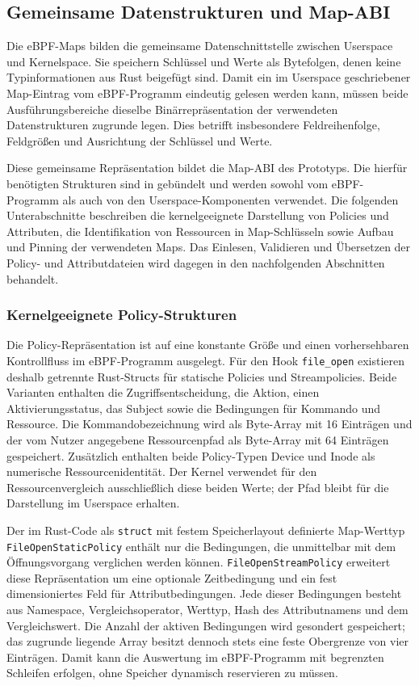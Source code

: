 \subsection{Gemeinsame Datenstrukturen und Map-ABI}\label{sec:map-abi}
Die eBPF-Maps bilden die gemeinsame Datenschnittstelle zwischen Userspace und Kernelspace. Sie speichern Schlüssel und Werte als Bytefolgen, denen keine Typinformationen aus Rust beigefügt sind. Damit ein im Userspace geschriebener Map-Eintrag vom eBPF-Programm eindeutig gelesen werden kann, müssen beide Ausführungsbereiche dieselbe Binärrepräsentation der verwendeten Datenstrukturen zugrunde legen. Dies betrifft insbesondere Feldreihenfolge, Feldgrößen und Ausrichtung der Schlüssel und Werte.

Diese gemeinsame Repräsentation bildet die Map-ABI des Prototyps. Die hierfür benötigten Strukturen sind in  gebündelt und werden sowohl vom eBPF-Programm als auch von den Userspace-Komponenten verwendet. Die folgenden Unterabschnitte beschreiben die kernelgeeignete Darstellung von Policies und Attributen, die Identifikation von Ressourcen in Map-Schlüsseln sowie Aufbau und Pinning der verwendeten Maps. Das Einlesen, Validieren und Übersetzen der Policy- und Attributdateien wird dagegen in den nachfolgenden Abschnitten behandelt.

\subsubsection{Kernelgeeignete Policy-Strukturen}
Die Policy-Repräsentation ist auf eine konstante Größe und einen vorhersehbaren Kontrollfluss im eBPF-Programm ausgelegt.
Für den Hook \texttt{file\_open} existieren deshalb getrennte Rust-Structs für statische Policies und Streampolicies.
Beide Varianten enthalten die Zugriffsentscheidung, die Aktion, einen Aktivierungsstatus, das Subject sowie die Bedingungen für Kommando und Ressource.
Die Kommandobezeichnung wird als Byte-Array mit 16 Einträgen und der vom Nutzer angegebene
Ressourcenpfad als Byte-Array mit 64 Einträgen gespeichert. Zusätzlich enthalten beide Policy-Typen
Device und Inode als numerische Ressourcenidentität. Der Kernel verwendet für den
Ressourcenvergleich ausschließlich diese beiden Werte; der Pfad bleibt für die Darstellung im
Userspace erhalten.

Der im Rust-Code als \texttt{struct} mit festem Speicherlayout definierte Map-Werttyp \texttt{FileOpenStaticPolicy} enthält nur die Bedingungen, die unmittelbar mit dem Öffnungsvorgang verglichen werden können. \texttt{FileOpenStreamPolicy} erweitert diese Repräsentation um eine optionale Zeitbedingung und ein fest dimensioniertes Feld für Attributbedingungen. Jede dieser Bedingungen besteht aus Namespace, Vergleichsoperator, Werttyp, Hash des Attributnamens und dem Vergleichswert. Die Anzahl der aktiven Bedingungen wird gesondert gespeichert; das zugrunde liegende Array besitzt dennoch stets eine feste Obergrenze von vier Einträgen. Damit kann die Auswertung im eBPF-Programm mit begrenzten Schleifen erfolgen, ohne Speicher dynamisch reservieren zu müssen.

